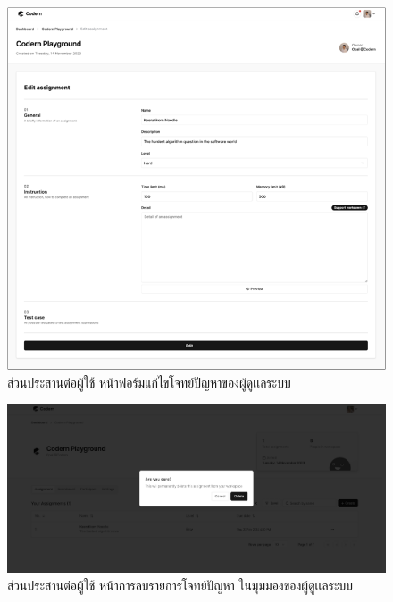 \documentclass[12pt,one side,openright,a4paper]{cpe-thesis-th}
\begin{document}
\begin{figure}[H]
    \centering
    \includegraphics[width=15cm]{figure/new-ui/ui-assign6.png}
    \caption[ส่วนประสานต่อผู้ใช้ หน้าฟอร์มแก้ไขโจทย์ปัญหา]{ส่วนประสานต่อผู้ใช้ หน้าฟอร์มแก้ไขโจทย์ปัญหาของผู้ดูเเลระบบ}
    \label{fig:new-ui-assign6}
\end{figure}

\begin{figure}[H]
    \centering
    \includegraphics[width=15cm]{figure/new-ui/ui-assign7.png}
    \caption[ส่วนประสานต่อผู้ใช้ หน้าการลบรายการโจทย์ปัญหาของผู้ดูเเลระบบ]{ส่วนประสานต่อผู้ใช้ หน้าการลบรายการโจทย์ปัญหา ในมุมมองของผู้ดูเเลระบบ}
    \label{fig:new-ui-assign7}
\end{figure}

\pagebreak
{}
 \\
\end{document}
